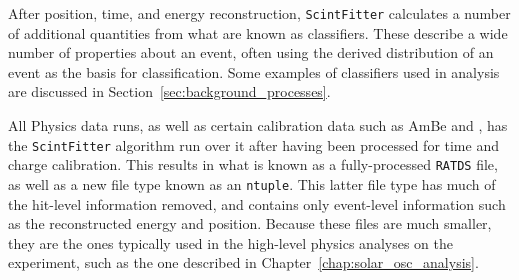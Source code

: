 After position, time, and energy reconstruction, \texttt{ScintFitter} calculates a number of additional quantities from what are known as classifiers. These describe a wide number of properties about an event, often using the derived \tres{} distribution of an event as the basis for classification. Some examples of classifiers used in analysis are discussed in Section~\ref{sec:background_processes}.

All Physics data runs, as well as certain calibration data such as AmBe and , has the \texttt{ScintFitter} algorithm run over it after having been processed for time and charge calibration. This results in what is known as a fully-processed \texttt{RATDS} file, as well as a new file type known as an \texttt{ntuple}. This latter file type has much of the hit-level information removed, and contains only event-level information such as the reconstructed energy and position. Because these files are much smaller, they are the ones typically used in the high-level physics analyses on the experiment, such as the one described in Chapter~\ref{chap:solar_osc_analysis}.


